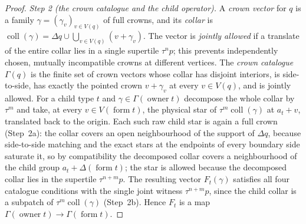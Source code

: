 \documentclass[11pt,a4paper]{article}
\theoremstyle{remark}
\begin{document}
\begin{proof}
\emph{Step 2 (the crown catalogue and the child operator).}  A \emph{crown
vector} for $q$ is a family $\gamma=(\gamma_v)_{v\in V(q)}$ of full crowns,
and its \emph{collar} is
$\operatorname{coll}(\gamma)=\Delta q\cup\bigcup_{v\in V(q)}(v+\gamma_v)$.
The vector is \emph{jointly allowed} if a translate of the entire collar
lies in a single supertile $\tau^n p$; this prevents independently chosen,
mutually incompatible crowns at different vertices.  The \emph{crown
catalogue} $\Gamma(q)$ is the finite set of crown vectors whose collar has
disjoint interiors, is side-to-side, has exactly the pointed crown
$v+\gamma_v$ at every $v\in V(q)$, and is jointly allowed.  For a child type
$t$ and $\gamma\in\Gamma(\operatorname{owner}t)$ decompose the whole collar
by $\tau^m$ and take, at every $v\in V(\operatorname{form}t)$, the physical
star of $\tau^m\operatorname{coll}(\gamma)$ at $a_t+v$, translated back to
the origin.  Each such raw child star is again a full crown (Step~2a): the
collar covers an open neighbourhood of the support of $\Delta q$, because
side-to-side matching and the exact stars at the endpoints of every
boundary side saturate it, so by compatibility the decomposed collar covers
a neighbourhood of the child group $a_t+\Delta(\operatorname{form}t)$; the
star is allowed because the decomposed collar lies in the supertile
$\tau^{n+m}p$.  The resulting vector $F_t(\gamma)$ satisfies all four
catalogue conditions with the single joint witness $\tau^{n+m}p$, since the
child collar is a subpatch of $\tau^m\operatorname{coll}(\gamma)$
(Step~2b).  Hence $F_t$ is a map
$\Gamma(\operatorname{owner}t)\to\Gamma(\operatorname{form}t)$.


\end{proof}
\end{document}
